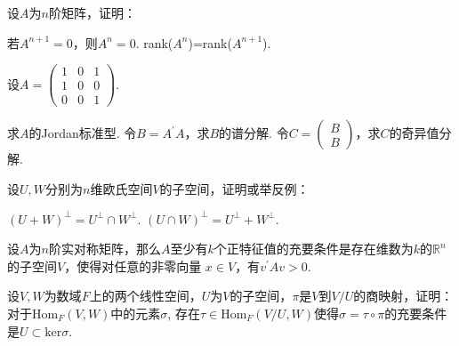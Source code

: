 \documentclass[windows]{BHCexam}
\begin{document}
\begin{groups}
\begin{questions}
        \end{questions}
        
        \begin{questions}
            \question 设$A$为$n$阶矩阵，证明：
            \begin{subquestions}
                \subquestion 若$A^{n+1}=0$，则$A^n=0$.
                \subquestion rank($A^n$)=rank($A^{n+1}$).
            \end{subquestions}
        \end{questions}

        \begin{questions}
            \question 设$A=\begin{pmatrix}
                1 & 0 & 1 \\
                1 & 0 & 0 \\
                0 & 0 & 1 
            \end{pmatrix}$.
            \begin{subquestions}
                \subquestion 求$A$的Jordan标准型.
                \subquestion 令$B=A^\prime A$，求$B$的谱分解.
                \subquestion 令$C=\begin{pmatrix}
                    B \\
                    B
                \end{pmatrix}$，求$C$的奇异值分解.
            \end{subquestions}
        \end{questions}

        \begin{questions}
            \question 设$U,W$分别为$n$维欧氏空间$V$的子空间，证明或举反例：
            \begin{subquestions}
                \subquestion $(U+W)^\bot = U^\bot  \cap  W^\bot $.
                \subquestion $(U\cap W)^\bot = U^\bot  + W^\bot $.
            \end{subquestions}
        \end{questions}

        \begin{questions}
            \question 设$A$为$n$阶实对称矩阵，那么$A$至少有$k$个正特征值的充要条件是存在维数为$k$的$\mathbb{R}^n$的子空间$V$，使得对任意的非零向量
            $x \in V$，有$v^\prime A v > 0$.
        \end{questions}

        \begin{questions}
            \question 设$V,W$为数域$F$上的两个线性空间，$U$为$V$的子空间，$\pi$是$V$到$V/U$的商映射，证明：对于$\text{Hom}_F(V,W)$中的元素$\sigma$,
            存在$\tau \in \text{Hom}_F(V/U,W)$使得$\sigma=\tau \circ \pi$的充要条件是$U \subset \text{ker} \sigma$.
        \end{questions}
	\end{groups}
\end{document}
